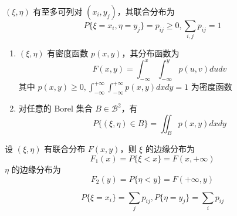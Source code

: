 \documentclass[12pt,a4paper]{amsart}
\begin{document}
\begin{definition}[离散型联合分布]
    $(\xi, \eta)$ 有至多可列对 $(x_i, y_j)$，其联合分布为
    \begin{equation}
        P\{\xi=x_i, \eta=y_j\} = p_{ij} \geq 0, \sum_{i,j}p_{ij} = 1
    \end{equation}
\end{definition}

\begin{definition}[连续型联合分布]
    \begin{enumerate}
        \item $(\xi, \eta)$ 有密度函数 $p(x, y)$，其分布函数为
        \begin{equation}
            F(x,y) = \int_{-\infty}^{x}\int_{-\infty}^{y}p(u, v)dudv
        \end{equation}
        其中 $p(x, y) \geq 0, \int_{-\infty}^{+\infty}\int_{-\infty}^{+\infty}p(x, y)dxdy = 1$ 为密度函数
        \item 对任意的 Borel 集合 $B\in\mathcal{B}^2$，有
        \begin{equation}
            P\{(\xi, \eta)\in B\} = \iint_Bp(x, y)dxdy
        \end{equation}
    \end{enumerate}
\end{definition}

\begin{definition}[边缘分布]
    设 $(\xi, \eta)$ 有联合分布 $F(x, y)$，则 $\xi$ 的边缘分布为
    \begin{equation}
        F_1(x) = P\{\xi < x\} = F(x, +\infty)
    \end{equation}
    $\eta$ 的边缘分布为
    \begin{equation}
        F_2(y) = P\{\eta < y\} = F(+\infty, y)
    \end{equation}
\end{definition}

\begin{definition}[离散型边缘分布]
    \begin{equation}
        P\{\xi=x_i\} = \sum_{j}p_{ij}, P\{\eta=y_j\} = \sum_{i}p_{ij}
    \end{equation}
\end{definition}
\end{document}
